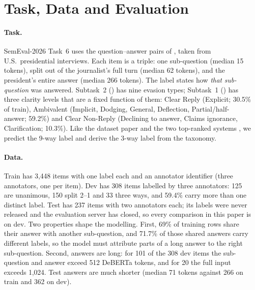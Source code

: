 \section{Task, Data and Evaluation}
\label{sec:task}

\paragraph{Task.}
SemEval-2026 Task~6 \citep{thomas-etal-2026-semeval} uses the question--answer pairs of \citet{thomas-etal-2024-never}, taken from U.S.\ presidential interviews.
Each item is a triple: one sub-question (median 15 tokens), split out of the journalist's full turn (median 62 tokens), and the president's entire answer (median 266 tokens).
The label states how \emph{that sub-question} was answered.
Subtask~2 (\Stwo{}) has nine evasion types; Subtask~1 (\Sone{}) has three clarity levels that are a fixed function of them: Clear Reply (Explicit; 30.5\% of train), Ambivalent (Implicit, Dodging, General, Deflection, Partial/half-answer; 59.2\%) and Clear Non-Reply (Declining to answer, Claims ignorance, Clarification; 10.3\%).
Like the dataset paper and the two top-ranked systems \citep{shi-etal-2026-teleai,peerachaidecho-rutherford-2026-chulanlp}, we predict the 9-way label and derive the 3-way label from the taxonomy.

\paragraph{Data.}
Train has 3,448 items with one label each and an annotator identifier (three annotators, one per item).
Dev has 308 items labelled by three annotators: 125 are unanimous, 150 split 2--1 and 33 three ways, and 59.4\% carry more than one distinct label.
Test has 237 items with two annotators each; its labels were never released and the evaluation server has closed, so every comparison in this paper is on dev.
Two properties shape the modelling.
First, 69\% of training rows share their answer with another sub-question, and 71.7\% of those shared answers carry different labels, so the model must attribute parts of a long answer to the right sub-question.
Second, answers are long: for 101 of the 308 dev items the sub-question and answer exceed 512 DeBERTa tokens, and for 20 the full input exceeds 1,024.
Test answers are much shorter (median 71 tokens against 266 on train and 362 on dev).

